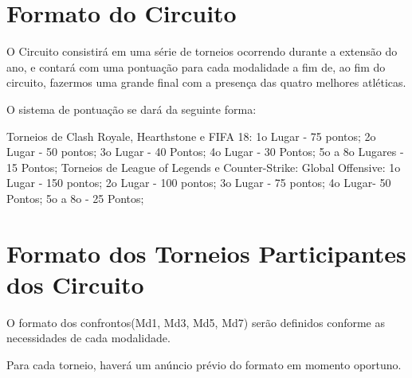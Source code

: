 \section{Formato do Circuito}

O Circuito consistirá em uma série de torneios ocorrendo durante a extensão do ano, e contará com uma pontuação para cada modalidade a fim de, ao fim do circuito, fazermos uma grande final com a presença das quatro melhores atléticas.

O sistema de pontuação se dará da seguinte forma:

Torneios de Clash Royale, Hearthstone e FIFA 18: 1o Lugar - 75 pontos; 2o Lugar - 50 pontos; 3o Lugar - 40 Pontos; 4o Lugar - 30 Pontos; 5o a 8o Lugares - 15 Pontos;
Torneios de League of Legends e Counter-Strike: Global Offensive: 1o Lugar - 150 pontos; 2o Lugar - 100 pontos; 3o Lugar - 75 pontos; 4o Lugar- 50 Pontos; 5o a 8o - 25 Pontos;


\section{Formato dos Torneios Participantes dos Circuito}


O formato dos confrontos(Md1, Md3, Md5, Md7) serão definidos conforme as necessidades de cada modalidade.

Para cada torneio, haverá um anúncio prévio do formato em momento oportuno.




